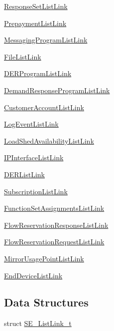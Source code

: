 \begin{DoxyCompactItemize}
\item 
\hyperlink{group__ResponseSetListLink}{Response\+Set\+List\+Link}
\item 
\hyperlink{group__PrepaymentListLink}{Prepayment\+List\+Link}
\item 
\hyperlink{group__MessagingProgramListLink}{Messaging\+Program\+List\+Link}
\item 
\hyperlink{group__FileListLink}{File\+List\+Link}
\item 
\hyperlink{group__DERProgramListLink}{D\+E\+R\+Program\+List\+Link}
\item 
\hyperlink{group__DemandResponseProgramListLink}{Demand\+Response\+Program\+List\+Link}
\item 
\hyperlink{group__CustomerAccountListLink}{Customer\+Account\+List\+Link}
\item 
\hyperlink{group__LogEventListLink}{Log\+Event\+List\+Link}
\item 
\hyperlink{group__LoadShedAvailabilityListLink}{Load\+Shed\+Availability\+List\+Link}
\item 
\hyperlink{group__IPInterfaceListLink}{I\+P\+Interface\+List\+Link}
\item 
\hyperlink{group__DERListLink}{D\+E\+R\+List\+Link}
\item 
\hyperlink{group__SubscriptionListLink}{Subscription\+List\+Link}
\item 
\hyperlink{group__FunctionSetAssignmentsListLink}{Function\+Set\+Assignments\+List\+Link}
\item 
\hyperlink{group__FlowReservationResponseListLink}{Flow\+Reservation\+Response\+List\+Link}
\item 
\hyperlink{group__FlowReservationRequestListLink}{Flow\+Reservation\+Request\+List\+Link}
\item 
\hyperlink{group__MirrorUsagePointListLink}{Mirror\+Usage\+Point\+List\+Link}
\item 
\hyperlink{group__EndDeviceListLink}{End\+Device\+List\+Link}
\end{DoxyCompactItemize}
\subsection*{Data Structures}
\begin{DoxyCompactItemize}
\item 
struct \hyperlink{structSE__ListLink__t}{S\+E\+\_\+\+List\+Link\+\_\+t}
\end{DoxyCompactItemize}

